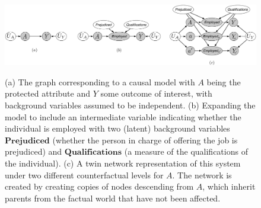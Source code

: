\begin{figure}[th!]
\begin{center}
\vspace{-1ex}
\centerline{\includegraphics[width=\textwidth]{implications_fig.pdf}}
\vspace{-2ex}
\label{fig:ex1}
  \caption{(a) The graph corresponding to a causal model with $A$ being the protected attribute
    and $Y$ some outcome of interest, with background variables assumed to be independent.
    (b) Expanding the model to include an intermediate variable indicating whether the individual
    is employed with two (latent) background variables $\textbf{Prejudiced}$ (whether the person in charge
    of offering the job is prejudiced) and $\textbf{Qualifications}$ (a measure of the qualifications of
    the individual). (c) A twin network representation of this system \citep{pearl:00}
    under two different counterfactual levels for $A$. The network is created by creating copies
    of nodes descending from $A$, which inherit parents from the factual world that have not
    been affected.}
\vspace{-2ex}
\end{center}

\end{figure}
